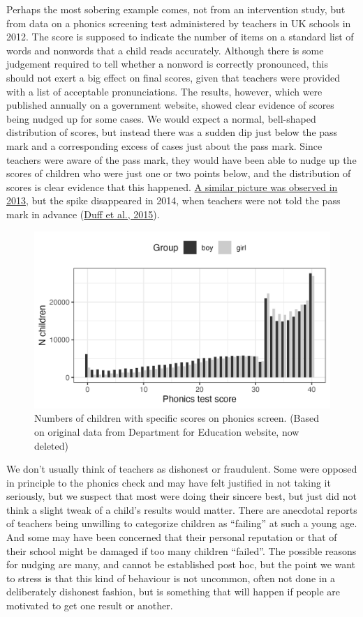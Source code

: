 \documentclass{krantz}
\begin{document}
Perhaps the most sobering example comes, not from an intervention study, but from data on a phonics screening test administered by teachers in UK schools in 2012. The score is supposed to indicate the number of items on a standard list of words and nonwords that a child reads accurately. Although there is some judgement required to tell whether a nonword is correctly pronounced, this should not exert a big effect on final scores, given that teachers were provided with a list of acceptable pronunciations. The results, however, which were published annually on a government website, showed clear evidence of scores being nudged up for some cases. We would expect a normal, bell-shaped distribution of scores, but instead there was a sudden dip just below the pass mark and a corresponding excess of cases just about the pass mark. Since teachers were aware of the pass mark, they would have been able to nudge up the scores of children who were just one or two points below, and the distribution of scores is clear evidence that this happened. \href{http://deevybee.blogspot.com/2013/10/good-and-bad-news-on-phonics-screen.html}{A similar picture was observed in 2013}, but the spike disappeared in 2014, when teachers were not told the pass mark in advance (\protect\hyperlink{ref-duff2015}{Duff et al., 2015}).

\begin{figure}
\includegraphics[width=0.8\linewidth]{images_bw/phonics} \caption{Numbers of children with specific scores on phonics screen. (Based on original data from Department for Education website, now deleted)}\label{fig:phonicsfig}
\end{figure}

We don't usually think of teachers as dishonest or fraudulent. Some were opposed in principle to the phonics check and may have felt justified in not taking it seriously, but we suspect that most were doing their sincere best, but just did not think a slight tweak of a child's results would matter. There are anecdotal reports of teachers being unwilling to categorize children as ``failing'' at such a young age. And some may have been concerned that their personal reputation or that of their school might be damaged if too many children ``failed''. The possible reasons for nudging are many, and cannot be established post hoc, but the point we want to stress is that this kind of behaviour is not uncommon, often not done in a deliberately dishonest fashion, but is something that will happen if people are motivated to get one result or another.
\end{document}
